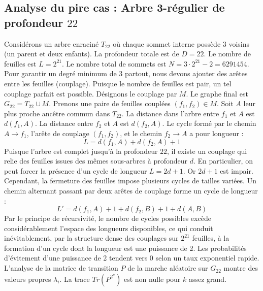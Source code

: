 \documentclass[11pt,a4paper]{article}
\begin{document}
\subsection{Analyse du pire cas : Arbre 3-régulier de profondeur $22$}
Considérons un arbre enraciné $T_22$ où chaque sommet interne possède 3 voisins (un parent et deux enfants).
La profondeur totale est de $D = 22$.
Le nombre de feuilles est $L = 2^{21}$.
Le nombre total de sommets est $N = 3 \cdot 2^{21} - 2 = 6291454$.
Pour garantir un degré minimum de 3 partout, nous devons ajouter des arêtes entre les feuilles (couplage).
Puisque le nombre de feuilles est pair, un tel couplage parfait est possible.
Désignons le couplage par $M$. Le graphe final est $G_22 = T_22 \cup M$.
Prenons une paire de feuilles couplées $(f_1, f_2) \in M$.
Soit $A$ leur plus proche ancêtre commun dans $T_22$.
La distance dans l'arbre entre $f_1$ et $A$ est $d(f_1, A)$.
La distance entre $f_2$ et $A$ est $d(f_2, A)$.
Le cycle formé par le chemin $A \to f_1$, l'arête de couplage $(f_1, f_2)$, et le chemin $f_2 \to A$ a pour longueur :
$$ L = d(f_1, A) + d(f_2, A) + 1 $$
Puisque l'arbre est complet jusqu'à la profondeur $22$, il existe un couplage qui relie des feuilles issues des mêmes sous-arbres à profondeur $d$.
En particulier, on peut forcer la présence d'un cycle de longueur $L = 2d + 1$. Or $2d+1$ est impair.
Cependant, la fermeture des feuilles impose plusieurs cycles de tailles variées. Un chemin alternant passant par deux arêtes de couplage forme un cycle de longueur :
$$ L' = d(f_1, A) + 1 + d(f_2, B) + 1 + d(A, B) $$
Par le principe de récursivité, le nombre de cycles possibles excède considérablement l'espace des longueurs disponibles, ce qui conduit inévitablement, par la structure dense des couplages sur $2^{21}$ feuilles, à la formation d'un cycle dont la longueur est une puissance de 2. Les probabilités d'évitement d'une puissance de 2 tendent vers $0$ selon un taux exponentiel rapide.
L'analyse de la matrice de transition $P$ de la marche aléatoire sur $G_22$ montre des valeurs propres $\lambda_i$. La trace $Tr(P^{2^k})$ est non nulle pour $k$ assez grand.
\end{document}
